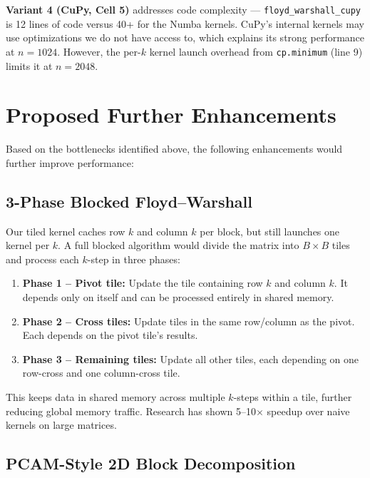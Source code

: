 \documentclass[11pt]{article}
\begin{document}
\textbf{Variant 4 (CuPy, Cell 5)} addresses code complexity --- \texttt{floyd\_warshall\_cupy} is 12 lines of code versus 40+ for the Numba kernels. CuPy's internal kernels may use optimizations we do not have access to, which explains its strong performance at $n = 1024$. However, the per-$k$ kernel launch overhead from \texttt{cp.minimum} (line 9) limits it at $n = 2048$.

\section{Proposed Further Enhancements}

Based on the bottlenecks identified above, the following enhancements would further improve performance:

\subsection{3-Phase Blocked Floyd--Warshall}

Our tiled kernel caches row $k$ and column $k$ per block, but still launches one kernel per $k$. A full blocked algorithm would divide the matrix into $B \times B$ tiles and process each $k$-step in three phases:

\begin{enumerate}
  \item \textbf{Phase 1 -- Pivot tile:} Update the tile containing row $k$ and column $k$. It depends only on itself and can be processed entirely in shared memory.
  \item \textbf{Phase 2 -- Cross tiles:} Update tiles in the same row/column as the pivot. Each depends on the pivot tile's results.
  \item \textbf{Phase 3 -- Remaining tiles:} Update all other tiles, each depending on one row-cross and one column-cross tile.
\end{enumerate}

This keeps data in shared memory across multiple $k$-steps within a tile, further reducing global memory traffic. Research has shown 5--10$\times$ speedup over naive kernels on large matrices.

\subsection{PCAM-Style 2D Block Decomposition}
\end{document}
